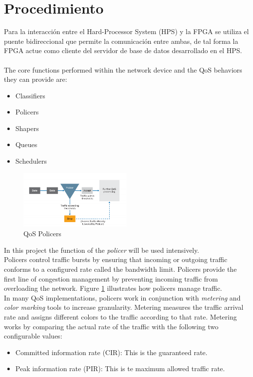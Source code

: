 \documentclass[conference]{IEEEtran}
\begin{document}
\section{Procedimiento}

Para la interacción entre el Hard-Processor System (HPS) y la FPGA se utiliza el puente bidireccional que permite la comunicación entre ambas, de tal forma la FPGA actue como cliente del servidor de base de datos desarrollado en el HPS.
\\ \\
The core functions performed within the network device and the QoS behaviors they can provide are:
\begin{itemize}
  \item Classifiers
  \item Policers
  \item Shapers
  \item Queues
  \item Schedulers
\end{itemize}
\begin{figure}[h]
	\centerline{\includegraphics[width=0.5\textwidth]{img/policer.png}}
	\caption{QoS Policers}
	\label{fig:qos01}
\end{figure}
In this project the function of the \textit{policer} will be used intensively.\\
Policers control traffic bursts by ensuring that incoming or outgoing traffic conforms to a configured rate called the bandwidth limit. Policers provide the first line of congestion management by preventing incoming traffic from overloading the network. Figure \ref{fig:qos01} illustrates how policers manage traffic.\\
In many QoS implementations, policers work in conjunction with \textit{metering} and \textit{color marking} tools to increase granularity. Metering measures the traffic arrival rate and assigns different colors to the traffic according to that rate. Metering works by comparing the actual rate of the traffic with the following two configurable values:
\begin{itemize}
  \item Committed information rate (CIR): This is the guaranteed rate.
  \item Peak information rate (PIR): This is te maximum allowed traffic rate.
\end{itemize}
\end{document}
